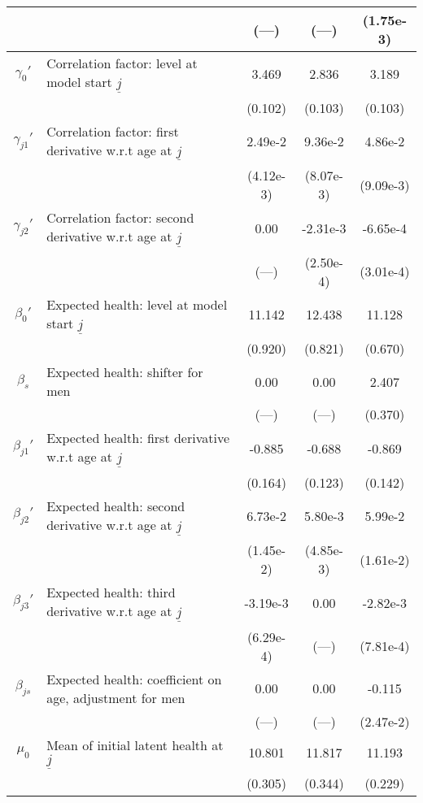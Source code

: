 \begin{table}
\begin{center}
{\begin{tabular}{clccc}
\rule{0pt}{2.2ex} & & (---) & (---) & (1.75e-3) \\
\hline
\rule{0pt}{2.2ex}$\gamma_{0}'$ & Correlation factor: level at model start $\underline{j}$ & 3.469 & 2.836 & 3.189 \\
\rule{0pt}{2.2ex} & & (0.102) & (0.103) & (0.103) \\
\rule{0pt}{2.2ex}$\gamma_{j1}'$ & Correlation factor: first derivative w.r.t age at $\underline{j}$ & 2.49e-2 & 9.36e-2 & 4.86e-2 \\
\rule{0pt}{2.2ex} & & (4.12e-3) & (8.07e-3) & (9.09e-3) \\
\rule{0pt}{2.2ex}$\gamma_{j2}'$ & Correlation factor: second derivative w.r.t age at $\underline{j}$ & 0.00 & -2.31e-3 & -6.65e-4 \\
\rule{0pt}{2.2ex} & & (---) & (2.50e-4) & (3.01e-4) \\
\hline
\rule{0pt}{2.2ex}$\beta_{0}'$ & Expected health: level at model start $\underline{j}$ & 11.142 & 12.438 & 11.128 \\
\rule{0pt}{2.2ex} & & (0.920) & (0.821) & (0.670) \\
\rule{0pt}{2.2ex}$\beta_{s}$ & Expected health: shifter for men & 0.00 & 0.00 & 2.407 \\
\rule{0pt}{2.2ex} & & (---) & (---) & (0.370) \\
\rule{0pt}{2.2ex}$\beta_{j1}'$ & Expected health: first derivative w.r.t age at $\underline{j}$ & -0.885 & -0.688 & -0.869 \\
\rule{0pt}{2.2ex} & & (0.164) & (0.123) & (0.142) \\
\rule{0pt}{2.2ex}$\beta_{j2}'$ & Expected health: second derivative w.r.t age at $\underline{j}$ & 6.73e-2 & 5.80e-3 & 5.99e-2 \\
\rule{0pt}{2.2ex} & & (1.45e-2) & (4.85e-3) & (1.61e-2) \\
\rule{0pt}{2.2ex}$\beta_{j3}'$ & Expected health: third derivative w.r.t age at $\underline{j}$ & -3.19e-3 & 0.00 & -2.82e-3 \\
\rule{0pt}{2.2ex} & & (6.29e-4) & (---) & (7.81e-4) \\
\rule{0pt}{2.2ex}$\beta_{js}$ & Expected health: coefficient on age, adjustment for men & 0.00 & 0.00 & -0.115 \\
\rule{0pt}{2.2ex} & & (---) & (---) & (2.47e-2) \\
\hline
\rule{0pt}{2.2ex}$\mu_0$ & Mean of initial latent health at $\underline{j}$ & 10.801 & 11.817 & 11.193 \\
\rule{0pt}{2.2ex} & & (0.305) & (0.344) & (0.229) \\

\end{tabular}}
\end{center}
\end{table}
